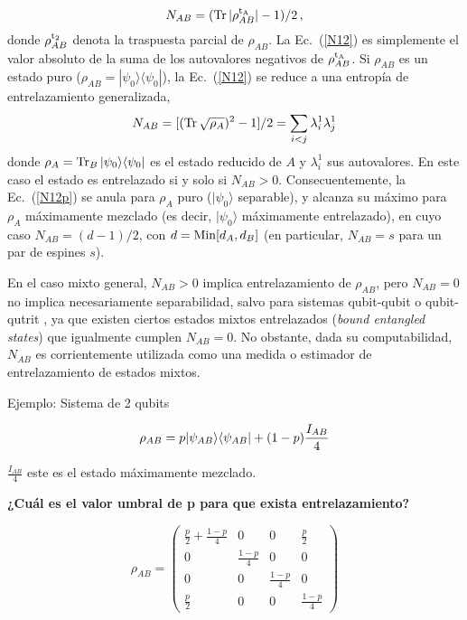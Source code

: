 \begin{equation}
N_{AB}=({\rm Tr}\,|\rho_{AB}^{\rm t_A}|-1)/2\label{N12}\,,\end{equation}
donde $\rho_{AB}^{\rm t_2}$ denota la traspuesta parcial de $\rho_{AB}$. La Ec.\ (\ref{N12})
es simplemente el valor absoluto de la suma de los autovalores negativos de $\rho_{AB}^{\rm t_A}$. 
Si $\rho_{AB}$ es un estado puro   ($\rho_{AB}=|\psi_0\rangle\langle\psi_0|$), la  Ec.\ (\ref{N12})
se reduce a una entropía de entrelazamiento generalizada,
\begin{equation}N_{AB}=[({\rm Tr}\,\sqrt{\rho_A})^2-1]/2
 =\sum_{i<j}\lambda_i^1\lambda^1_j\label{N12p}\end{equation}
donde $\rho_A={\rm Tr}_B\,|\psi_0\rangle\langle\psi_0|$ 
es el estado reducido de $A$  y $\lambda^1_i$ sus autovalores. En este caso el estado es entrelazado si y solo si $N_{AB}>0$. Consecuentemente, la Ec.\
(\ref{N12p}) se anula para $\rho_A$ puro ($|\psi_0\rangle$ separable), y
alcanza su máximo para $\rho_A$  máximamente mezclado (es decir, $|\psi_0\rangle$ máximamente entrelazado),
en cuyo caso $N_{AB}=(d-1)/2$, con $d={\rm Min}[d_A,d_B]$ (en particular, $N_{AB}=s$  para un par de espines $s$). 

En el caso mixto general, $N_{AB}>0$ implica entrelazamiento de $\rho_{AB}$, pero $N_{AB}=0$ no implica necesariamente separabilidad, salvo para sistemas qubit-qubit o qubit-qutrit \cite{Ho.96}, ya que existen ciertos estados mixtos entrelazados ({\it bound entangled states}) que igualmente cumplen $N_{AB}=0$. 
No obstante, dada su computabilidad, $N_{AB}$ es corrientemente utilizada como una medida o estimador de entrelazamiento de estados mixtos. 

Ejemplo: Sistema de 2 qubits

\[
\rho_{AB}=p\PROYECT{\psi_{AB}}{\psi_{AB}}+\PARENTESIS{1-p}\frac{I_{AB}}{4}
\]

$\frac{I_{AB}}{4}$ este es el estado máximamente mezclado.

\textbf{¿Cuál es el valor umbral de p para que exista entrelazamiento?}

\[
\rho_{AB}=\left(\begin{array}{cccc}
\frac{p}{2}+\frac{1-p}{4} & 0 & 0 & \frac{p}{2}\\
0 & \frac{1-p}{4} & 0 & 0\\
0 & 0 & \frac{1-p}{4} & 0\\
\frac{p}{2} & 0 & 0 & \frac{1-p}{4}
\end{array}\right)
\]


